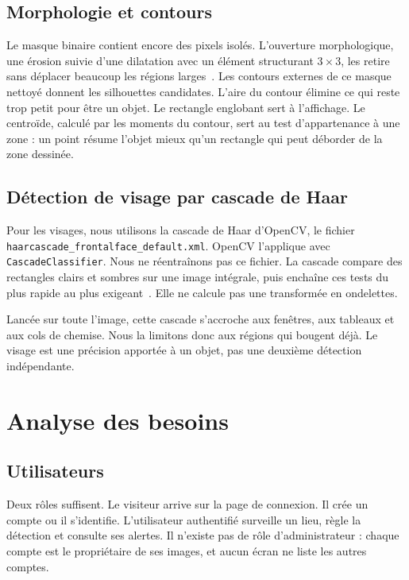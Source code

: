 \section{Morphologie et contours}

Le masque binaire contient encore des pixels isolés. L'ouverture morphologique, une érosion suivie d'une dilatation avec un élément structurant $3\times 3$, les retire sans déplacer beaucoup les régions larges~\cite{gonzalez}. Les contours externes de ce masque nettoyé donnent les silhouettes candidates. L'aire du contour élimine ce qui reste trop petit pour être un objet. Le rectangle englobant sert à l'affichage. Le centroïde, calculé par les moments du contour, sert au test d'appartenance à une zone : un point résume l'objet mieux qu'un rectangle qui peut déborder de la zone dessinée.

\section{Détection de visage par cascade de Haar}

Pour les visages, nous utilisons la cascade de Haar d'OpenCV, le fichier \texttt{haarcascade\_frontalface\_default.xml}. OpenCV l'applique avec \texttt{CascadeClassifier}. Nous ne réentraînons pas ce fichier. La cascade compare des rectangles clairs et sombres sur une image intégrale, puis enchaîne ces tests du plus rapide au plus exigeant~\cite{viola}. Elle ne calcule pas une transformée en ondelettes.

Lancée sur toute l'image, cette cascade s'accroche aux fenêtres, aux tableaux et aux cols de chemise. Nous la limitons donc aux régions qui bougent déjà. Le visage est une précision apportée à un objet, pas une deuxième détection indépendante.

\chapter{Analyse des besoins}
\label{chap:analyse}

\section{Utilisateurs}

Deux rôles suffisent. Le visiteur arrive sur la page de connexion. Il crée un compte ou il s'identifie. L'utilisateur authentifié surveille un lieu, règle la détection et consulte ses alertes. Il n'existe pas de rôle d'administrateur : chaque compte est le propriétaire de ses images, et aucun écran ne liste les autres comptes.

